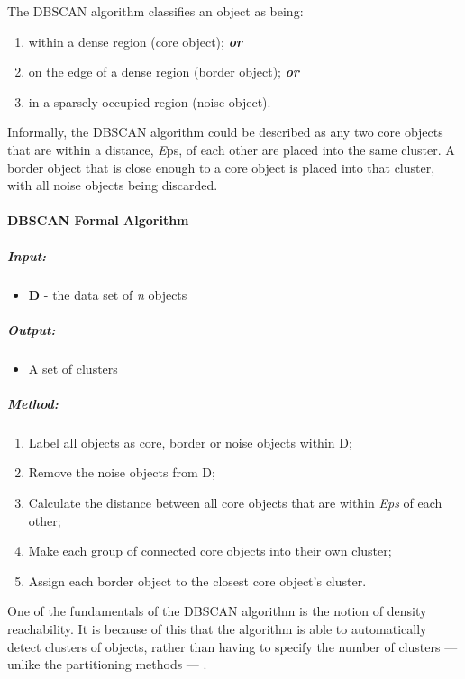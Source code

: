 The DBSCAN algorithm classifies an object as being:
\begin{enumerate}
  \item within a dense region (core object); {\bf \em or}
  \item on the edge of a dense region (border object); {\bf \em or}
  \item in a sparsely occupied region (noise object).
\end{enumerate}

Informally, the DBSCAN algorithm could be described as any two core objects 
that are within a distance, {\emph Eps}, of each other are placed into the same 
cluster. A border object that is close enough to a core object is placed into 
that cluster, with all noise objects being discarded. 

\paragraph*{DBSCAN Formal Algorithm}
\subparagraph*{Input:}
\begin{itemize}
  \item {\bf D} - the data set of {\em n} objects
\end{itemize}

\subparagraph*{Output:}
\begin{itemize}
  \item A set of clusters
\end{itemize}

\subparagraph*{Method:}
\begin{enumerate}
  \item Label all objects as core, border or noise objects within D;
  \item Remove the noise objects from D;
  \item Calculate the distance between all core objects that are within 
        {\em Eps} of each other;
  \item Make each group of connected core objects into their own cluster;
  \item Assign each border object to the closest core object’s cluster.
\end{enumerate}

One of the fundamentals of the DBSCAN algorithm is the notion of density 
reachability. It is because of this that the algorithm is able to automatically
detect clusters of objects, rather than having to specify the number of 
clusters --- unlike the partitioning methods --- \citep{han06}. 

